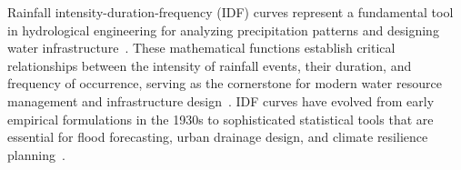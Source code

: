 Rainfall intensity-duration-frequency (IDF) curves represent a fundamental tool in hydrological engineering for analyzing precipitation patterns and designing water infrastructure~\cite{nhess-24-873-2024, doi:10.1061/TACEAT.0004286}. 
These mathematical functions establish critical relationships between the intensity of rainfall events, their duration, and frequency of occurrence, serving as the cornerstone for modern water resource management and infrastructure design~\cite{egusphere-2025-621}.
IDF curves have evolved from early empirical formulations in the 1930s to sophisticated statistical tools that are essential for flood forecasting, urban drainage design, and climate resilience planning~\cite{GonzalezAlvarez2017, doi:10.1061/TACEAT.0004286}.